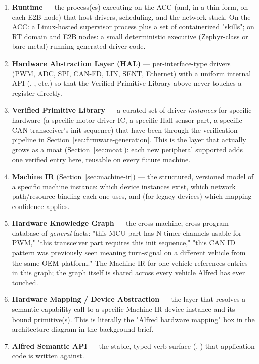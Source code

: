 \begin{enumerate}
\item \textbf{Runtime} --- the process(es) executing on the ACC (and, in a thin form, on each E2B node) that host drivers, scheduling, and the network stack. On the ACC: a Linux-hosted supervisor process plus a set of containerized "skills"; on RT domain and E2B nodes: a small deterministic executive (Zephyr-class or bare-metal) running generated driver code.
\item \textbf{Hardware Abstraction Layer (HAL)} --- per-interface-type drivers (PWM, ADC, SPI, CAN-FD, LIN, SENT, Ethernet) with a uniform internal API (, , etc.) so that the Verified Primitive Library above never touches a register directly.
\item \textbf{Verified Primitive Library} --- a curated set of driver \emph{instances} for specific hardware (a specific motor driver IC, a specific Hall sensor part, a specific CAN transceiver's init sequence) that have been through the verification pipeline in Section~\ref{sec:firmware-generation}. This is the layer that actually grows as a moat (Section~\ref{sec:moat}): each new peripheral supported adds one verified entry here, reusable on every future machine.
\item \textbf{Machine IR} (Section~\ref{sec:machine-ir}) --- the structured, versioned model of a specific machine instance: which device instances exist, which network path/resource binding each one uses, and (for legacy devices) which mapping confidence applies.
\item \textbf{Hardware Knowledge Graph} --- the cross-machine, cross-program database of \emph{general} facts: "this MCU part has N timer channels usable for PWM," "this transceiver part requires this init sequence," "this CAN ID pattern was previously seen meaning turn-signal on a different vehicle from the same OEM platform." The Machine IR for one vehicle references entries in this graph; the graph itself is shared across every vehicle Alfred has ever touched.
\item \textbf{Hardware Mapping / Device Abstraction} --- the layer that resolves a semantic capability call to a specific Machine-IR device instance and its bound primitive(s). This is literally the "Alfred hardware mapping" box in the architecture diagram in the background brief.
\item \textbf{Alfred Semantic API} --- the stable, typed verb surface (, ) that application code is written against.

\end{enumerate}
